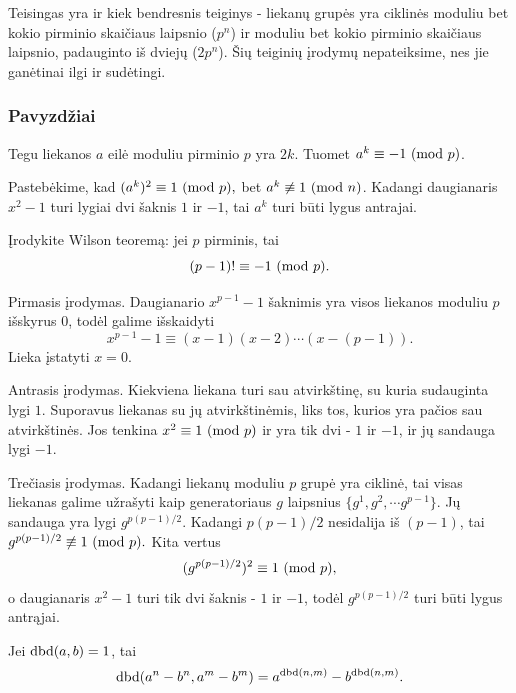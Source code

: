 Teisingas yra ir kiek bendresnis teiginys - liekanų grupės yra ciklinės
moduliu bet kokio pirminio skaičiaus laipsnio ($p^n$) ir moduliu bet kokio
pirminio skaičiaus laipsnio, padauginto iš dviejų ($2p^n$). Šių teiginių
įrodymų nepateiksime, nes jie ganėtinai ilgi ir sudėtingi.

\subsubsection{Pavyzdžiai}
\begin{pavnr}
  Tegu liekanos $a$ eilė moduliu pirminio $p$ yra $2k$. Tuomet $a^k \equiv -1
  \ (\text{mod } p)$.
\end{pavnr}

\begin{sprendimas}
Pastebėkime, kad $(a^k)^2 \equiv 1 \ (\text{mod } p),$ bet $a^k \not \equiv 1 \ (\text{mod } n)$.
Kadangi daugianaris $x^2-1$ turi lygiai dvi šaknis $1$ ir $-1$, tai $a^k$
turi būti lygus antrajai.
\end{sprendimas}

\begin{pavnr}
  Įrodykite Wilson teoremą: jei $p$ pirminis, tai $$(p-1)! \equiv -1
  \ (\text{mod } p).$$
\end{pavnr}

\begin{sprendimas}
Pirmasis įrodymas. Daugianario $x^{p-1} - 1$ šaknimis yra visos liekanos
moduliu $p$ išskyrus $0$, todėl galime išskaidyti $$x^{p-1} - 1\equiv
(x-1)(x-2)\cdots(x-(p-1)).$$ Lieka įstatyti $x = 0$.

Antrasis įrodymas. Kiekviena liekana turi sau atvirkštinę, su kuria
sudauginta lygi $1$. Suporavus liekanas su jų atvirkštinėmis, liks tos,
kurios yra pačios sau atvirkštinės. Jos tenkina $x^2 \equiv 1\ (\text{mod } p)$ ir yra
tik dvi - $1$ ir $-1$, ir jų sandauga lygi $-1$.

Trečiasis įrodymas. Kadangi liekanų moduliu $p$ grupė yra ciklinė, tai
visas liekanas galime užrašyti kaip generatoriaus $g$ laipsnius
$\{g^1, g^2, \cdots g^{p-1}\}$. Jų sandauga yra lygi $g^{p(p-1)/2}$.
Kadangi $p(p-1)/2$ nesidalija iš $(p-1)$, tai $g^{p(p-1)/2} \not \equiv 1
\ (\text{mod } p).$ Kita vertus $$(g^{p(p-1)/2})^2 \equiv 1 \ (\text{mod } p),$$ o daugianaris $x^2-1$
turi tik dvi šaknis - $1$ ir $-1$, todėl $g^{p(p-1)/2}$ turi būti lygus
antrąjai. 
\end{sprendimas}

\begin{pavnr}
  Jei $\operatorname{dbd}(a,b) = 1$, tai $$\operatorname{dbd}(a^n - b^n, a^m - b^m) = a^{\operatorname{dbd}(n,m)} -
  b^{\operatorname{dbd}(n,m)}.$$
\end{pavnr}

